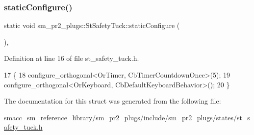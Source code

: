 \subsubsection{\texorpdfstring{static\+Configure()}{staticConfigure()}}
{\footnotesize\ttfamily static void sm\+\_\+pr2\+\_\+plugs\+::\+St\+Safety\+Tuck\+::static\+Configure (\begin{DoxyParamCaption}{ }\end{DoxyParamCaption})\hspace{0.3cm}{\ttfamily [inline]}, {\ttfamily [static]}}



Definition at line 16 of file st\+\_\+safety\+\_\+tuck.\+h.


\begin{DoxyCode}
17     \{
18         configure\_orthogonal<OrTimer,  CbTimerCountdownOnce>(5);    
19         configure\_orthogonal<OrKeyboard, CbDefaultKeyboardBehavior>();
20     \}
\end{DoxyCode}


The documentation for this struct was generated from the following file\+:\begin{DoxyCompactItemize}
\item 
smacc\+\_\+sm\+\_\+reference\+\_\+library/sm\+\_\+pr2\+\_\+plugs/include/sm\+\_\+pr2\+\_\+plugs/states/\hyperlink{st__safety__tuck_8h}{st\+\_\+safety\+\_\+tuck.\+h}\end{DoxyCompactItemize}
